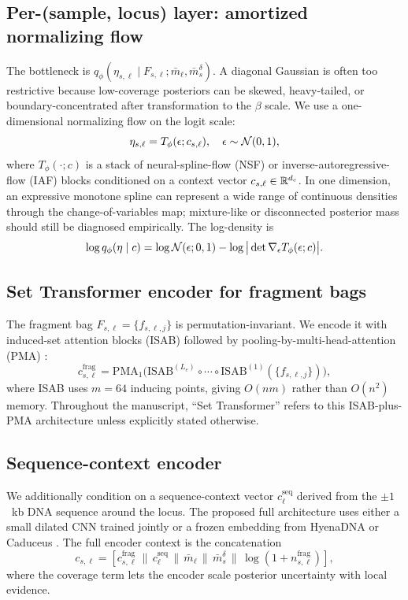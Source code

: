 \subsection{Per-(sample, locus) layer: amortized normalizing flow}
The bottleneck is $q_\phi(\eta_{s,\ell}\mid F_{s,\ell};\bar m_\ell,\bar m_s^\delta)$. A diagonal Gaussian is often too restrictive because low-coverage posteriors can be skewed, heavy-tailed, or boundary-concentrated after transformation to the $\beta$ scale. We use a one-dimensional normalizing flow on the logit scale:
\begin{equation}
\eta_{s,\ell} = T_\phi(\epsilon; c_{s,\ell}),\quad \epsilon\sim\mathcal{N}(0,1),
\end{equation}
where $T_\phi(\cdot; c)$ is a stack of neural-spline-flow (NSF) \citep{durkan2019nsf} or inverse-autoregressive-flow (IAF) \citep{kingma2016iaf} blocks conditioned on a context vector $c_{s,\ell}\in\mathbb{R}^{d_c}$. In one dimension, an expressive monotone spline can represent a wide range of continuous densities through the change-of-variables map; mixture-like or disconnected posterior mass should still be diagnosed empirically. The log-density is
\begin{equation}
\log q_\phi(\eta\mid c) = \log\mathcal{N}(\epsilon;0,1) - \log\big|\det\nabla_\epsilon T_\phi(\epsilon; c)\big|.
\label{eq:flow-density}
\end{equation}

\subsection{Set Transformer encoder for fragment bags}
The fragment bag $F_{s,\ell}=\{f_{s,\ell,j}\}$ is permutation-invariant. We encode it with induced-set attention blocks (ISAB) followed by pooling-by-multi-head-attention (PMA) \citep{lee2019settransformer}:
\begin{equation}
c^{\mathrm{frag}}_{s,\ell}=\mathrm{PMA}_1\big(\mathrm{ISAB}^{(L_e)}\circ\cdots\circ \mathrm{ISAB}^{(1)}(\{f_{s,\ell,j}\})\big),
\end{equation}
where ISAB uses $m=64$ inducing points, giving $O(nm)$ rather than $O(n^2)$ memory. Throughout the manuscript, ``Set Transformer'' refers to this ISAB-plus-PMA architecture unless explicitly stated otherwise.

\subsection{Sequence-context encoder}
We additionally condition on a sequence-context vector $c^{\mathrm{seq}}_\ell$ derived from the $\pm 1$~kb DNA sequence around the locus. The proposed full architecture uses either a small dilated CNN trained jointly or a frozen embedding from HyenaDNA \citep{nguyen2023hyenadna} or Caduceus \citep{schiff2024caduceus}. The full encoder context is the concatenation
\begin{equation}
c_{s,\ell}=[c^{\mathrm{frag}}_{s,\ell}\,\|\,c^{\mathrm{seq}}_\ell\,\|\,\bar m_\ell\,\|\,\bar m_s^\delta\,\|\,\log(1+n^{\mathrm{frag}}_{s,\ell})],
\end{equation}
where the coverage term lets the encoder scale posterior uncertainty with local evidence.

